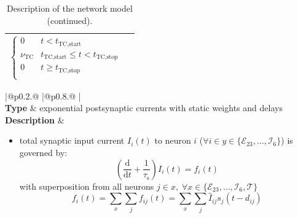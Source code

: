 \documentclass[10pt,a4paper,twoside,american]{article}
\theoremstyle{definitionstyle}
\newcommand{\diff}{\ensuremath{\text{d}}}
\newcommand{\tauS}{\tau_\text{s}}
\begin{document}
\begin{table}[H]
\begin{tabular}{
  |@{\hspace*{\marg}}p{}@{\hspace*{\marg}}
  |@{\hspace*{\marg}}p{}@{\hspace*{\marg}}
  |}
\begin{equation}
    \begin{cases}
      0 & t<t_\text{TC,start}\\
       \nu_\text{TC} & t_\text{TC,start} \le t < t_\text{TC,stop}\\
      0 & t\ge{}t_\text{TC,stop}\\
    \end{cases}
  \end{equation}\\
  \hline
\end{tabular}
\caption{Description of the network model (continued).}
\label{tab:model_description_2}
\end{table}
\clearpage
\begin{table}[H]
\begin{tabular}{
  |@{\hspace*{\marg}}p{}@{\hspace*{\marg}}
  |@{\hspace*{\marg}}p{}@{\hspace*{\marg}}
  |}
  \hline 
  \\
  \hline 
  \textbf{Type} & exponential postsynaptic currents with static weights and delays \\
  \hline 
  \textbf{Description} &
  \begin{itemize}
	\item total synaptic input current $I_i(t)$ to neuron $i$ ($\forall i \in y\in\{\mathcal{E}_{23},\ldots,\mathcal{I}_{6}\}$) is governed by:
		\begin{equation}
			\label{eq:synaptic_current}
			\left(\frac{\diff}{\diff t} + \frac{1}{\tauS}\right) I_{i} (t) = f_{i}(t)
		\end{equation}
		with superposition from all neurons $j \in x,\;\forall x\in\{\mathcal{E}_{23},\ldots,\mathcal{I}_{6}, \mathcal{T}\}$
		\begin{equation}
			f_{i} (t) = \sum_{x} \sum_{j} f_{ij} (t) = \sum_{x} \sum_{j} \hat{I}_{ij} s_{j}(t-d_{ij})
		\end{equation}

\end{itemize}
\end{tabular}
\end{table}
\end{document}
